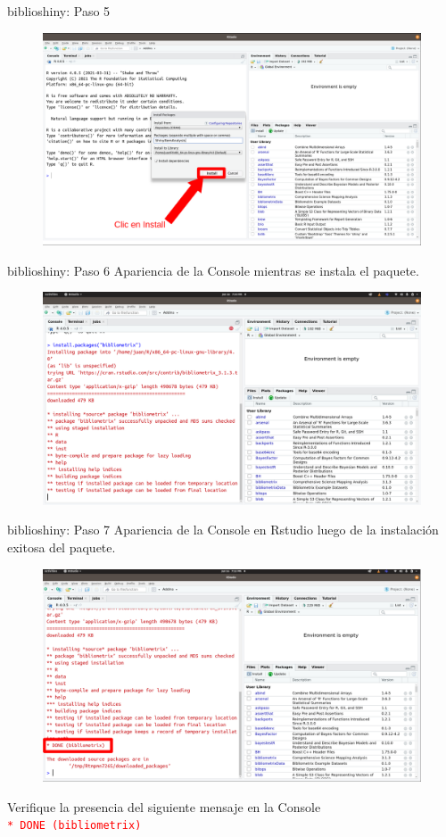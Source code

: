 \documentclass{beamer}
\begin{document}
\begin{frame}{biblioshiny: Paso 5}
\begin{figure}
\centering
\includegraphics[width=.92\textwidth]{Paso4.png}
\end{figure}  
\end{frame}

\begin{frame}{biblioshiny: Paso 6}
Apariencia de la Console mientras se instala el paquete.
\begin{figure}
\centering
\includegraphics[width=.85\textwidth]{Paso5.png}
\end{figure}  
\end{frame}

\begin{frame}{biblioshiny: Paso 7}
Apariencia de la Console en Rstudio luego de la instalación exitosa del paquete.
\begin{figure}
\centering
\includegraphics[width=.85\textwidth]{Paso6.png}
\end{figure}  
Verifique la presencia del siguiente mensaje en la Console\\
\textcolor{red}{\texttt{* DONE (bibliometrix)}}
\end{frame}
\end{document}
